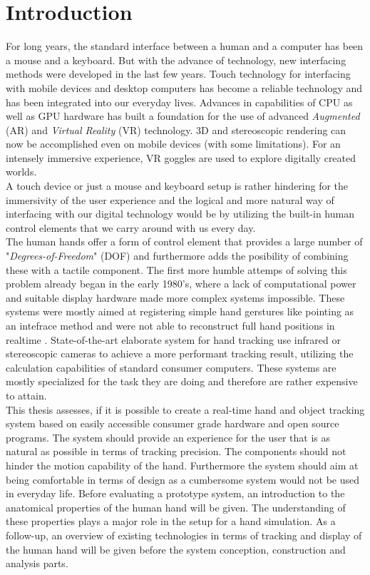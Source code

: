 \chapter{Introduction}
For long years, the standard interface between a human and a computer has been a mouse and a keyboard. But with the advance of technology, new interfacing methods were developed in the last few years.
Touch technology for interfacing with mobile devices and desktop computers has become a reliable technology and has been integrated into our everyday lives.
Advances in capabilities of CPU as well as GPU hardware has built a foundation for the use of advanced \textit{Augmented} (AR) and \textit{Virtual Reality} (VR) technology. 3D and stereoscopic rendering can now be accomplished even on mobile devices (with some limitations). For an intensely immersive experience, VR goggles are used to explore digitally created worlds.\\
A touch device or just a mouse and keyboard setup is rather hindering for the immersivity of the user experience and the logical and more natural way of interfacing with our digital technology would be by utilizing the built-in human control elements that we carry around with us every day.\\ The human hands offer a form of control element that provides a large number of "\textit{Degrees-of-Freedom}" (DOF) and furthermore adds the posibility of combining these with a tactile component. The first more humble attemps of solving this problem already began in the early 1980's, where a lack of computational power and suitable display hardware made more complex systems impossible. These systems were mostly aimed at registering simple hand gerstures like pointing as an intefrace method and were not able to reconstruct full hand positions in realtime \cite{Bolt.1980}. State-of-the-art elaborate system for hand tracking use infrared or stereoscopic cameras to achieve a  more performant tracking result, utilizing the calculation capabilities of standard consumer computers. These systems are mostly specialized for the task they are doing and therefore are rather expensive to attain. \\
This thesis assesses, if it is possible to create a real-time hand and object tracking system based on easily accessible consumer grade hardware and open source programs. The system should provide an experience for the user that is as natural as possible in terms of tracking precision. The components should not hinder the motion capability of the hand. Furthermore the system should aim at being comfortable in terms of design as a cumbersome system would not be used in everyday life.
Before evaluating a prototype system, an introduction to the anatomical properties of the human hand will be given. The understanding of these properties plays a major role in the setup for a hand simulation. As a follow-up, an overview of existing technologies in terms of tracking and display of the human hand will be given before the system conception, construction and analysis parts.

